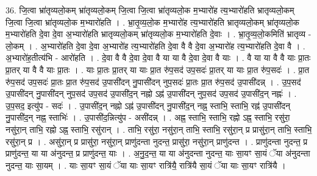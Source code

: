 \documentclass[17pt]{extarticle}
\begin{document}
36. जि॒त्वा भ्रा॑तृव्यलो॒कम् भ्रा॑तृव्यलो॒कम् जि॒त्वा जि॒त्वा भ्रा॑तृव्यलो॒क म॒भ्यारो॑ह त्य॒भ्यारो॑हति भ्रातृव्यलो॒कम् जि॒त्वा जि॒त्वा भ्रा॑तृव्यलो॒क म॒भ्यारो॑हति । . भ्रा॒तृ॒व्य॒लो॒क म॒भ्यारो॑ह त्य॒भ्यारो॑हति भ्रातृव्यलो॒कम् भ्रा॑तृव्यलो॒क म॒भ्यारो॑हति दे॒वा दे॒वा अ॒भ्यारो॑हति भ्रातृव्यलो॒कम् भ्रा॑तृव्यलो॒क म॒भ्यारो॑हति दे॒वाः । . भ्रा॒तृ॒व्य॒लो॒कमिति॑ भ्रातृव्य - लो॒कम् । . अ॒भ्यारो॑हति दे॒वा दे॒वा अ॒भ्यारो॑ह त्य॒भ्यारो॑हति दे॒वा वै वै दे॒वा अ॒भ्यारो॑ह त्य॒भ्यारो॑हति दे॒वा वै । . अ॒भ्यारो॑ह॒तीत्य॑भि - आरो॑हति । . दे॒वा वै वै दे॒वा दे॒वा वै या या वै दे॒वा दे॒वा वै याः । . वै या या वै वै याः प्रा॒तः प्रा॒तर् या वै वै याः प्रा॒तः । . याः प्रा॒तः प्रा॒तर् या याः प्रा॒त रु॑प॒सद॑ उप॒सदः॑ प्रा॒तर् या याः प्रा॒त रु॑प॒सदः॑ । . प्रा॒त रु॑प॒सद॑ उप॒सदः॑ प्रा॒तः प्रा॒त रु॑प॒सद॑ उ॒पासी॑दन् नु॒पासी॑दन् नुप॒सदः॑ प्रा॒तः प्रा॒त रु॑प॒सद॑ उ॒पासी॑दन्न् । . उ॒प॒सद॑ उ॒पासी॑दन् नु॒पासी॑दन् नुप॒सद॑ उप॒सद॑ उ॒पासी॑द॒न् नह्नो ऽह्न॑ उ॒पासी॑दन् नुप॒सद॑ उप॒सद॑ उ॒पासी॑द॒न् नह्नः॑ । . उ॒प॒सद॒ इत्यु॑प - सदः॑ । . उ॒पासी॑द॒न् नह्नो ऽह्न॑ उ॒पासी॑दन् नु॒पासी॑द॒न् नह्न॒ स्ताभि॒ स्ताभि॒ रह्न॑ उ॒पासी॑दन् नु॒पासी॑द॒न् नह्न॒ स्ताभिः॑ । . उ॒पासी॑द॒न्नित्यु॑प - असी॑दन्न् । . अह्न॒ स्ताभि॒ स्ताभि॒ रह्नो ऽह्न॒ स्ताभि॒ रसु॑रा॒ नसु॑रा॒न् ताभि॒ रह्नो ऽह्न॒ स्ताभि॒ रसु॑रान् । . ताभि॒ रसु॑रा॒ नसु॑रा॒न् ताभि॒ स्ताभि॒ रसु॑रा॒न् प्र प्रासु॑रा॒न् ताभि॒ स्ताभि॒ रसु॑रा॒न् प्र । . असु॑रा॒न् प्र प्रासु॑रा॒ नसु॑रा॒न् प्राणु॑दन्ता नुदन्त॒ प्रासु॑रा॒ नसु॑रा॒न् प्राणु॑दन्त । . प्राणु॑दन्ता नुदन्त॒ प्र प्राणु॑दन्त॒ या या अ॑नुदन्त॒ प्र प्राणु॑दन्त॒ याः । . अ॒नु॒द॒न्त॒ या या अ॑नुदन्ता नुदन्त॒ याः सा॒यꣳ सा॒यं ॅया अ॑नुदन्ता नुदन्त॒ याः सा॒यम् । . याः सा॒यꣳ सा॒यं ॅया याः सा॒यꣳ रात्रि॑यै॒ रात्रि॑यै सा॒यं ॅया याः सा॒यꣳ रात्रि॑यै । \newline
\end{document}
